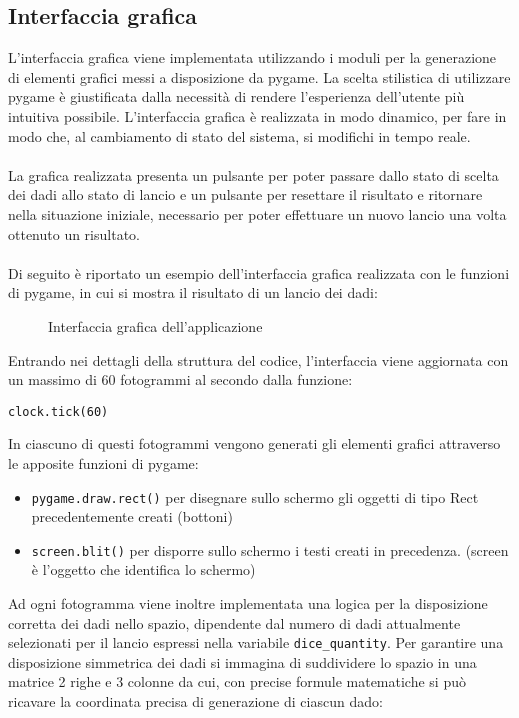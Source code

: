 \subsection{Interfaccia grafica}
L'interfaccia grafica viene implementata utilizzando i moduli per la generazione di elementi grafici messi a disposizione da pygame.
La scelta stilistica di utilizzare pygame è giustificata dalla necessità di rendere l'esperienza dell'utente più intuitiva possibile.
L'interfaccia grafica è realizzata in modo dinamico, per fare in modo che, al cambiamento di stato del sistema, si modifichi in tempo reale.
\\\\La grafica realizzata presenta un pulsante per poter passare dallo stato di scelta dei dadi allo stato di lancio e un pulsante per resettare il risultato
e ritornare nella situazione iniziale, necessario per poter effettuare un nuovo lancio una volta ottenuto un risultato.
\\\\Di seguito è riportato un esempio dell'interfaccia grafica realizzata con le funzioni di pygame, in cui si mostra il risultato di un lancio dei dadi:
\begin{figure}[H]
    \centering
    \caption{Interfaccia grafica dell'applicazione}
    \label{fig:RollStateON3}
\end{figure}
Entrando nei dettagli della struttura del codice, l'interfaccia viene aggiornata con un massimo di 60 fotogrammi al secondo dalla funzione:
\begin{verbatim}
clock.tick(60)
\end{verbatim}
In ciascuno di questi fotogrammi vengono generati gli elementi grafici attraverso le apposite funzioni di pygame:
\begin{itemize}
    \item \Verb#pygame.draw.rect()# per disegnare sullo schermo gli oggetti di tipo Rect precedentemente creati (bottoni)
    \item \Verb#screen.blit()# per disporre sullo schermo i testi creati in precedenza. (screen è l'oggetto che identifica lo schermo)
\end{itemize}
Ad ogni fotogramma viene inoltre implementata una logica per la disposizione corretta dei dadi nello spazio, dipendente dal numero di dadi attualmente
selezionati per il lancio espressi nella variabile \Verb|dice_quantity|. Per garantire una disposizione simmetrica dei dadi si immagina di
suddividere lo spazio in una matrice 2 righe e 3 colonne da cui, con precise formule matematiche si può ricavare la coordinata precisa di generazione di ciascun dado:

